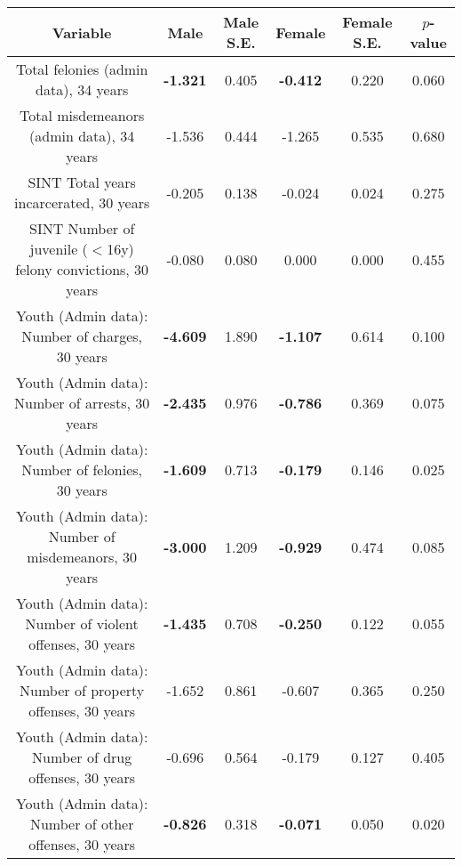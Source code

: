 \begin{longtable}{c c c c c c}
\toprule
\textbf{Variable} & \textbf{Male} & \textbf{Male S.E.}  & \textbf{Female} & \textbf{Female S.E.} & \textbf{$ p $-value} \\
\midrule
Total felonies (admin data), 34 years & \textbf{-1.321} & 0.405 &  \textbf{-0.412} & 0.220 & 0.060 \\
Total misdemeanors (admin data), 34 years & -1.536 & 0.444 &  -1.265 & 0.535 & 0.680 \\
SINT Total years incarcerated, 30 years & -0.205 & 0.138 &  -0.024 & 0.024 & 0.275 \\
SINT Number of juvenile ($ < $16y) felony convictions, 30 years & -0.080 & 0.080 &  0.000 & 0.000 & 0.455 \\
Youth (Admin data): Number of charges, 30 years & \textbf{-4.609} & 1.890 &  \textbf{-1.107} & 0.614 & 0.100 \\
Youth (Admin data): Number of arrests, 30 years & \textbf{-2.435} & 0.976 &  \textbf{-0.786} & 0.369 & 0.075 \\
Youth (Admin data): Number of felonies, 30 years & \textbf{-1.609} & 0.713 &  \textbf{-0.179} & 0.146 & 0.025 \\
Youth (Admin data): Number of misdemeanors, 30 years & \textbf{-3.000} & 1.209 &  \textbf{-0.929} & 0.474 & 0.085 \\
Youth (Admin data): Number of violent offenses, 30 years & \textbf{-1.435} & 0.708 &  \textbf{-0.250} & 0.122 & 0.055 \\
Youth (Admin data): Number of property offenses, 30 years & -1.652 & 0.861 &  -0.607 & 0.365 & 0.250 \\
Youth (Admin data): Number of drug offenses, 30 years & -0.696 & 0.564 &  -0.179 & 0.127 & 0.405 \\
Youth (Admin data): Number of other offenses, 30 years & \textbf{-0.826} & 0.318 &  \textbf{-0.071} & 0.050 & 0.020 \\
\bottomrule
\end{longtable}
